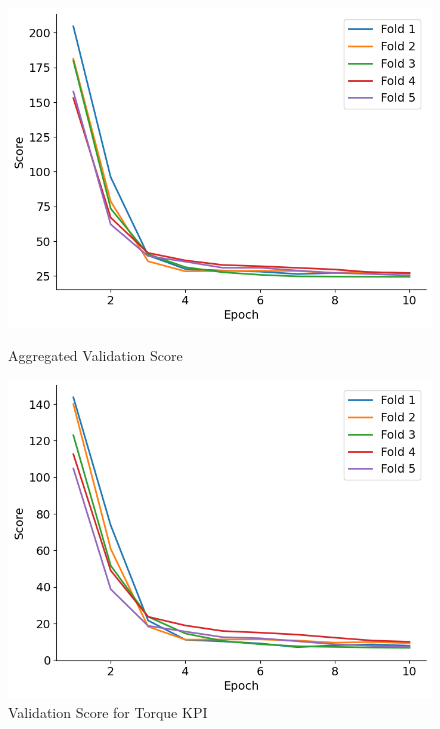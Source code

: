 \documentclass{report} %
\begin{document}
\begin{figure}[H]
    \centering
    \begin{minipage}[b]{0.325\textwidth}
        \includegraphics[width=\textwidth]{./ReportImages/val_score.png}
        \caption{\centering Aggregated Validation Score}
        \label{fig:Aggregated Validation Score}
    \end{minipage}
    \begin{minipage}[b]{0.325\textwidth}
        \includegraphics[width=\textwidth]{./ReportImages/val_score_y1.png}
        \caption{\centering Validation Score for Torque \ac{KPI}}
        \label{fig:Validation Score for Torque Curve}
    \end{minipage}
    \hfill

\end{figure}
\end{document}
